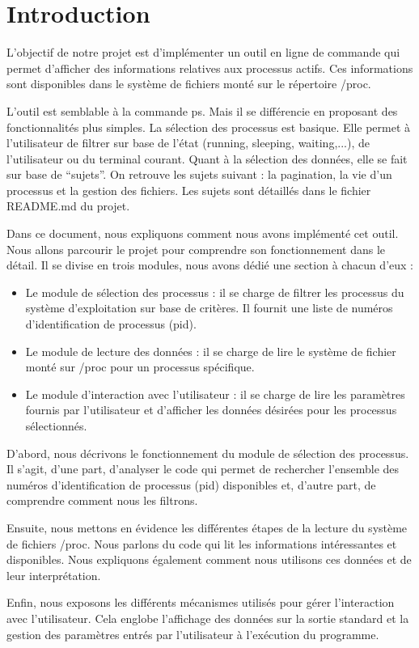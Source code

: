 \section{Introduction}
L’objectif de notre projet est d’implémenter un outil en ligne de commande qui permet d’afficher des informations relatives aux processus actifs. Ces informations sont disponibles dans le système de fichiers monté sur le répertoire /proc.

L’outil est semblable à la commande ps. Mais il se différencie en proposant des fonctionnalités plus simples.  La sélection des processus est basique. Elle permet à l’utilisateur de filtrer sur base de l’état (running, sleeping, waiting,...), de l’utilisateur ou du terminal courant. Quant à la sélection des données, elle se fait sur base de “sujets”. On retrouve les sujets suivant : la pagination, la vie d’un processus et la gestion des fichiers. Les sujets sont détaillés dans le fichier README.md du projet.

Dans ce document, nous expliquons comment nous avons implémenté cet outil. Nous allons parcourir le projet pour comprendre son fonctionnement dans le détail. Il se divise en trois modules, nous avons dédié une section à chacun d’eux :

\begin{itemize}
\item Le module de sélection des processus : il se charge de filtrer les processus du système d’exploitation sur base de critères. Il fournit une liste de numéros d’identification de processus (pid).
\item Le module de lecture des données : il se charge de lire le système de fichier monté sur /proc pour un processus spécifique.
\item Le module d’interaction avec l’utilisateur : il se charge de lire les paramètres fournis par l’utilisateur et d’afficher les données désirées pour les processus sélectionnés.
\end{itemize}

D’abord, nous décrivons le fonctionnement du module de sélection des processus. Il s’agit, d’une part, d’analyser le code qui permet de rechercher l’ensemble des numéros  d’identification de processus (pid) disponibles et, d’autre part, de comprendre comment nous les filtrons.

Ensuite, nous mettons en évidence les différentes étapes de la lecture du système de fichiers /proc. Nous parlons du code qui lit les informations intéressantes et disponibles. Nous expliquons également comment nous utilisons ces données et de leur interprétation.

Enfin, nous exposons les différents mécanismes utilisés pour gérer l’interaction avec l’utilisateur. Cela englobe l’affichage des données sur la sortie standard et la gestion des paramètres entrés par l’utilisateur à l’exécution du programme.
